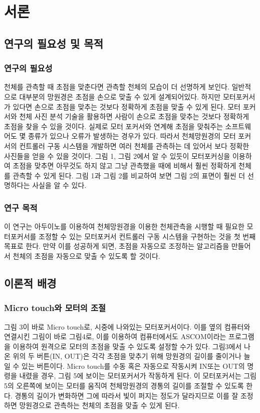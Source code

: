 \section{서론}

\subsection{연구의 필요성 및 목적}

\subsubsection{연구의 필요성}

천체를 관측할 때 초점을 맞춘다면 관측할 천체의 모습이 더 선명하게 보인다. 일반적으로 대부분의 망원경은 초점을 손으로 맞출 수 있게 설계되어있다. 하지만 모터포커서가 있다면 손으로 초점을 맞추는 것보다 정확하게 초점을 맞출 수 있게 된다. 모터 포커서와 천체 사진 분석 기술을 활용하면 사람이 손으로 초점을 맞추는 것보다 정확하게 초점을 찾을 수 있을 것이다. 실제로 모터 포커서와 연계해 초점을 맞춰주는 소프트웨어도 몇 종류가 있으나 오류가 발생하는 경우가 있다. 따라서 천체망원경의 모터 포커서의 컨트롤러 구동 시스템을 개발하면 여러 천체를 관측하는 데 있어서 보다 정확한 사진들을 얻을 수 있을 것이다.
그림 1, 그림 2에서 알 수 있듯이 모터포커싱을 이용하여 초점을 맞추면 아무것도 하지 않고 그냥 관측했을 때에 비해서 훨씬 정확하게 천체를 관측할 수 있게 된다. 그림 1과 그림 2를 비교하여 보면 그림 2의 표면이 훨씬 더 선명하다는 사실을 알 수 있다.

\subsubsection{연구 목적}

이 연구는 아두이노를 이용하여 천체망원경을 이용한 천체관측을 시행할 때 필요한 모터포커서를 조정할 수 있는 모터포커서 컨트롤러 구동 시스템을 구현하는 것을 첫 번째 목표로 한다. 만약 이를 성공하게 되면, 초점을 자동으로 조정하는 알고리즘을 만들어서 천체의 초점을 자동으로 맞출 수 있도록 할 것이다.

\subsection{이론적 배경}

\subsubsection{Micro touch와 모터의 조절}

그림 3이 바로 Micro touch로, 시중에 나와있는 모터포커서이다. 이를 옆의 컴퓨터와 연결시킨 그림이 바로 그림4로, 이를 이용하여 컴퓨터에서도 ASCOM이라는 프로그램을 이용하여 원격으로 모터의 초점을 
맞출 수 있도록 설정할 수가 있다. 그림3에서 나온 위의 두 버튼(IN, OUT)은 각각 초점을 맞추기 위해 망원경의 길이를 줄이거나 늘일 수 있는 버튼이다. 
Micro touch를 수동 혹은 자동으로 작동시켜 IN또는 OUT의 명령을 내렸을 경우, 그림 5에 보이는 모터포커서가 작동하게 된다. 이 모터포커서는 그림 5의 오른쪽에 보이는 모터를 움직여 천체망원경의 경통의 길이를 조절할 수 있도록 한다. 경통의 길이가 변화하면 그에 따라서 빛이 퍼지는 정도가 달라지므로 이를 잘 조정하면 망원경으로 관측하는 천체의 초점을 맞출 수 있게 된다.

